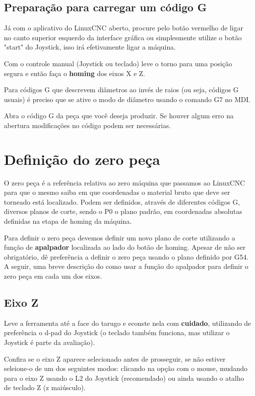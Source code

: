 \documentclass[twoside,a4paper]{refart}
\begin{document}
\subsection{Preparação para carregar um código G}

Já com o aplicativo do LinuxCNC aberto, procure pelo botão vermelho de ligar no canto superior esquerdo da interface gráfica ou simplesmente utilize o botão "start" do Joystick, isso irá efetivamente ligar a máquina. 

Com o controle manual (Joystick ou teclado) leve o torno para uma posição segura e então faça o \textbf{homing} dos eixos X e Z.

Para códigos G que descrevem diâmetros ao invés de raios (ou seja, códigos G usuais) é preciso que se ative o modo de diâmetro usando o comando G7 no MDI.

Abra o código G da peça que você deseja produzir. Se houver algum erro na abertura modificações no código podem ser necessárias.

\section{Definição do zero peça}

O zero peça é a referência relativa ao zero máquina que passamos ao LinuxCNC para que o mesmo saiba em que coordenadas o material bruto que deve ser torneado está localizado. Podem ser definidos, através de diferentes códigos G, diversos planos de corte, sendo o P0 o plano padrão, em coordenadas absolutas definidas na etapa de homing da máquina.

Para definir o zero peça devemos definir um novo plano de corte utilizando a função de \textbf{apalpador} localizada ao lado do botão de homing. Apesar de não ser obrigatório, dê preferência a definir o zero peça usando o plano definido por G54. A seguir, uma breve descrição do como usar a função do apalpador para definir o zero peça em cada um dos eixos.

\subsection{Eixo Z}

Leve a ferramenta até a face do tarugo e econste nela com \textbf{cuidado}, utilizando de preferência o d-pad do Joystick (o teclado também funciona, mas utilizar o Joystick é parte da avaliação). 

Confira se o eixo Z aparece selecionado antes de prosseguir, se não estiver seleione-o de um dos seguintes modos: clicando na opção com o mouse, mudando para o eixo Z usando o L2 do Joystick (recomendado) ou ainda usando o atalho de teclado Z (z maiúsculo).
\end{document}
